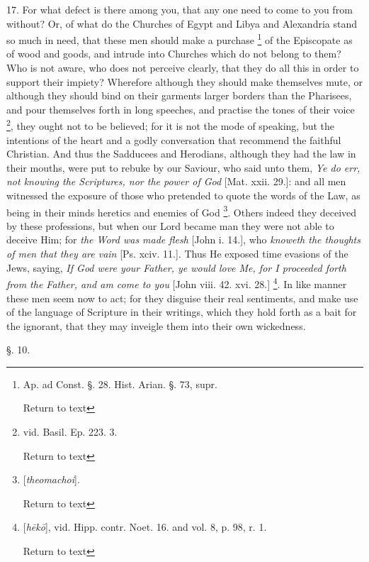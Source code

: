 17. For what defect is there among you, that any
one need to come to you from without? Or, of what do the Churches of
Egypt and Libya and Alexandria stand so much in need, that these men
should make a purchase \footnote{Ap. ad Const. §. 28. Hist. Arian. §. 73, supr.

Return to text}
of the Episcopate as of wood and goods, and intrude into Churches
which do not belong to them? Who is not aware, who does not perceive
clearly, that they do all this in order to support their impiety?
Wherefore although they should make themselves mute, or although they
should bind on their garments larger borders than the Pharisees, and
pour themselves forth in long speeches, and practise the tones of
their voice \footnote{vid. Basil. Ep. 223. 3.

Return to text}, they
ought not to be believed; for it is not the mode of speaking, but the
intentions of the heart and a godly conversation that recommend the
faithful Christian. And thus the Sadducees and Herodians, although
they had the law in their mouths, were put to rebuke by our Saviour,
who said unto them, \emph{Ye do err, not knowing the Scriptures, nor the
power of God} [Mat. xxii. 29.]: and all men witnessed the exposure
of those who pretended to quote the words of the Law, as being in
their minds heretics and enemies of God \footnote{[\emph{theomachoi}].

Return to text}. Others indeed they deceived by these professions, but when
our Lord became man they were not able to deceive Him; for \emph{the Word
was made flesh} [John i. 14.], who \emph{knoweth the thoughts of men
that they are vain} [Ps. xciv. 11.]. Thus He exposed time evasions
of the Jews, saying, \emph{If God were your Father, ye would love Me, for
I proceeded forth from the Father, and am come to you} [John viii.
42. xvi. 28.] \footnote{[\emph{h\={e}k\={o}}], vid. Hipp. contr. Noet. 16. and vol. 8,
p. 98, r. 1.

Return to text}. In
like manner these men seem now to act; for they disguise their real
sentiments, and make use of the language of Scripture in their
writings, which they hold forth as a bait for the ignorant, that they
may inveigle them into their own wickedness.

§. 10.

